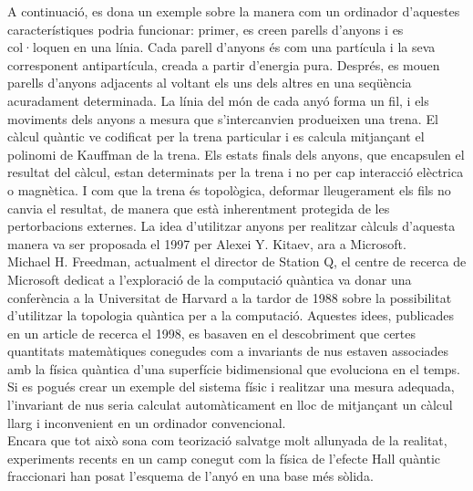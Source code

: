 A continuació, es dona un exemple sobre la manera com un ordinador d'aquestes característiques podria funcionar: primer, es creen parells d'anyons i es col·loquen en una línia. Cada parell d'anyons és com una partícula i la seva corresponent antipartícula, creada a partir d'energia pura. Després, es mouen parells d'anyons adjacents al voltant els uns dels altres en una seqüència acuradament determinada. La línia del món de cada anyó forma un fil, i els moviments dels anyons a mesura que s'intercanvien produeixen una trena. El càlcul quàntic ve codificat per la trena particular i es calcula mitjançant el polinomi de Kauffman de la trena. Els estats finals dels anyons, que encapsulen el resultat del càlcul, estan determinats per la trena i no per cap interacció elèctrica o magnètica. I com que la trena és topològica, deformar lleugerament els fils no canvia el resultat, de manera que està inherentment protegida de les pertorbacions externes. La idea d'utilitzar anyons per realitzar càlculs d'aquesta manera va ser proposada el 1997 per Alexei Y. Kitaev, ara a Microsoft.\\

Michael H. Freedman, actualment el director de Station Q, el centre de recerca de Microsoft dedicat a l'exploració de la computació quàntica va donar una conferència a la Universitat de Harvard a la tardor de 1988 sobre la possibilitat d'utilitzar la topologia quàntica per a la computació. Aquestes idees, publicades en un article de recerca el 1998, es basaven en el descobriment que certes quantitats matemàtiques conegudes com a invariants de nus estaven associades amb la física quàntica d'una superfície bidimensional que evoluciona en el temps. Si es pogués crear un exemple del sistema físic i realitzar una mesura adequada, l'invariant de nus seria calculat automàticament en lloc de mitjançant un càlcul llarg i inconvenient en un ordinador convencional.\\

Encara que tot això sona com teorizació salvatge molt allunyada de la realitat, experiments recents en un camp conegut com la física de l'efecte Hall quàntic fraccionari han posat l'esquema de l'anyó en una base més sòlida.